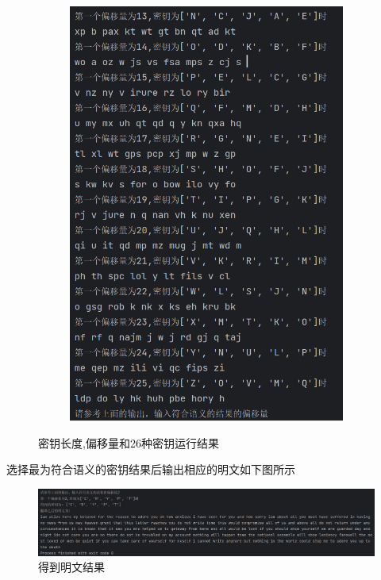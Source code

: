 \begin{figure}[htbp]
\begin{subfigure}[b]{0.4\textwidth}
                \includegraphics[width=\textwidth]{images/vigenere2_result2_1.2.png}
                \label{fig:subfig2}
            \end{subfigure}
        
            \caption{密钥长度,偏移量和26种密钥运行结果}
            \label{fig:subfigures}
        \end{figure}

        选择最为符合语义的密钥结果后输出相应的明文如下图所示
        \begin{figure}[htbp] %
            \centering    %
            \includegraphics[width=18cm]{images/vigenere2_result2_1.3.png}  %
            \caption{得到明文结果}    %
            \label{pic1}        %
        \end{figure}